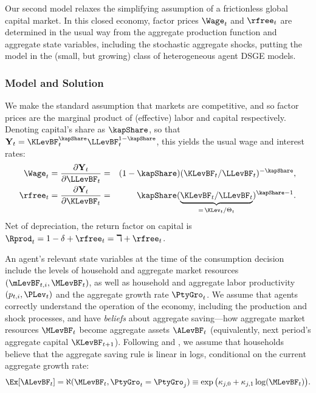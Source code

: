 \documentclass[titlepage]{\econtex}\newcommand{\texname}{cAndCwithStickyE}
\begin{document}
Our second model relaxes the simplifying assumption of a frictionless global capital market.  In this closed economy, factor prices $\Wage_t$ and $\rfree_t$ are determined in the usual way from the aggregate production function and aggregate state variables, including the stochastic aggregate shocks, putting the model in the (small, but growing) class of heterogeneous agent DSGE models.

\subsubsection{Model and Solution}

We make the standard assumption that markets are competitive, and so factor prices are the
marginal product of (effective) labor and capital respectively. Denoting capital's share as $\kapShare$,
so that $\textbf{Y}_t = \KLevBF_t^\kapShare \LLevBF_t^{1-\kapShare}$, this yields the usual wage and interest rates:
\begin{eqnarray}
\Wage_t = \frac{\partial \textbf{Y}_t}{\partial \LLevBF_t} &=& (1-\kapShare) (\KLevBF_t/\LLevBF_t)^{-\kapShare}, \label{eq:MargProd} \\
\rfree_t = \frac{\partial \textbf{Y}_t}{\partial \KLevBF_t} &=& \kapShare (\underbrace{\KLevBF_t/\LLevBF_t}_{=\,\KLev_t/\Theta_t})^{\kapShare-1}. \nonumber
\end{eqnarray}
Net of depreciation, the return factor on capital is $\Rprod_t = 1 -\delta + \rfree_t = \daleth + \rfree_t$.

An agent's relevant state variables at the time of the consumption decision include the levels of household and aggregate market resources $(\mLevBF_{t,i},\MLevBF_t)$, as well as household and aggregate labor productivity $(p_{t,i},\PLev_t)$ and the aggregate growth rate $\PtyGro_t$.  We assume that agents correctly understand the operation of the economy, including the production and shock processes, and have \textit{beliefs} about aggregate saving---how aggregate market resources $\MLevBF_t$ become aggregate assets $\ALevBF_t$ (equivalently, next period's aggregate capital $\KLevBF_{t+1}$).  Following \cite{ksHetero} and \cite{cstwMPC}, we assume that households believe that the aggregate saving rule is linear in logs, conditional on the current aggregate growth rate:
\begin{equation}\label{eq:AggSaving}
\Ex[\ALevBF_t] = \aleph(\MLevBF_t,\PtyGro_t = \PtyGro_j) \equiv \exp\big(\aggrSavingRuleCoeff_{j,0} + \aggrSavingRuleCoeff_{j,1}\log(\MLevBF_t)\big).
\end{equation}
\end{document}
